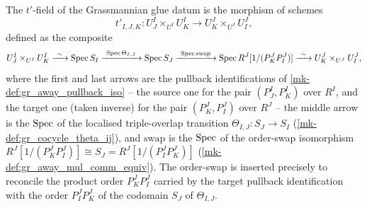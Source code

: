 \begin{definition}\label{mk-def:gr_chart_transition'}
  \leanok

  The \(t'\)-field of the Grassmannian glue datum is the morphism of schemes
  \[
    t'_{I,J,K} : U^I_J \times_{U^I} U^I_K \longrightarrow U^J_K \times_{U^J} U^J_I ,
  \]
  defined as the composite
  \[
    U^I_J \times_{U^I} U^I_K
      \xrightarrow{\ \sim\ } \operatorname{Spec} S_I
      \xrightarrow{\ \operatorname{Spec} \Theta_{I,J}\ } \operatorname{Spec} S_J
      \xrightarrow{\ \operatorname{Spec} \mathrm{swap}\ } \operatorname{Spec} R^J[1/(P^J_K P^J_I)]
      \xrightarrow{\ \sim\ } U^J_K \times_{U^J} U^J_I ,
  \]
  where the first and last arrows are the pullback identifications of
  \ref{mk-def:gr_away_pullback_iso} -- the source one for the pair \((P^I_J, P^I_K)\)
  over \(R^I\), and the target one (taken inverse) for the pair \((P^J_K, P^J_I)\)
  over \(R^J\) -- the middle arrow is the \(\operatorname{Spec}\) of the localised
  triple-overlap transition \(\Theta_{I,J} : S_J \to S_I\)
  (\ref{mk-def:gr_cocycle_theta_ij}), and \(\mathrm{swap}\) is the \(\operatorname{Spec}\) of the
  order-swap isomorphism \(R^J[1/(P^J_K P^J_I)] \cong S_J = R^J[1/(P^J_I P^J_K)]\)
  (\ref{mk-def:gr_away_mul_comm_equiv}). The order-swap is inserted precisely to
  reconcile the product order \(P^J_K P^J_I\) carried by the target pullback
  identification with the order \(P^J_I P^J_K\) of the codomain \(S_J\) of
  \(\Theta_{I,J}\).
\end{definition}

